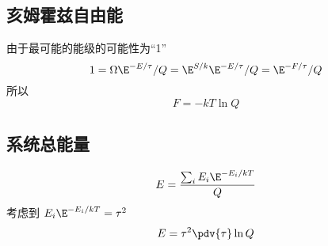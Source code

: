 
\begin{issues}
\issueDraft
\end{issues}

\subsection{亥姆霍兹自由能}
由于最可能的能级的可能性为“1”
\begin{equation}
1 = \Omega \E^{-E/\tau}/Q = \E^{S/k} \E^{- E/\tau}/Q = \E^{-F/\tau}/Q
\end{equation}
所以
\begin{equation}
F = -kT\ln Q
\end{equation}

\subsection{系统总能量}
\begin{equation}
E = \frac{\sum_i E_i \E^{-E_i/kT}}{Q}
\end{equation}
考虑到 $E_i \E^{-E_i/kT} = \tau^2$ %
\begin{equation}
E = \tau ^2\pdv{\tau} \ln Q
\end{equation}